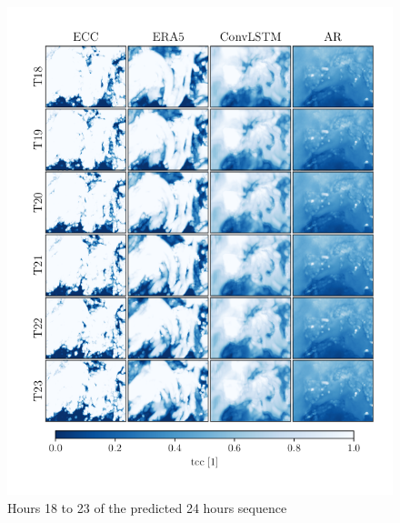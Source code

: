 \begin{figure}[ht]
    \centering
    \includegraphics{python_figs/comparing_seq_part_4_of4_jan2.png}
    \caption{Hours 18 to 23 of the predicted 24 hours sequence }
    \label{fig:part4/4}
\end{figure}
\cleardoublepage
